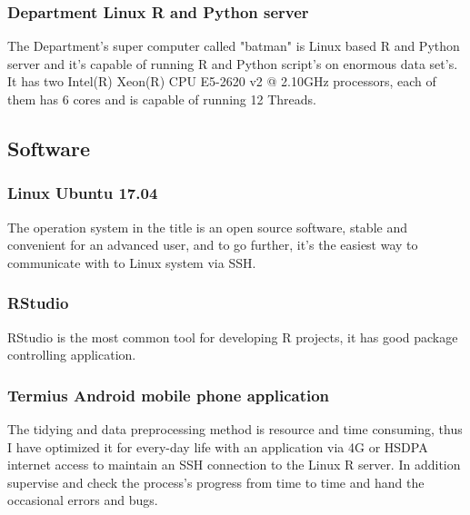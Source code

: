 			\subsubsection{Department Linux R and Python server}
The Department's super computer called "batman" is Linux based R and Python server and it's capable of running R and Python script's on enormous data set's. It has two Intel(R) Xeon(R) CPU E5-2620 v2 @ 2.10GHz processors, each of them has 6 cores and is capable of running 12 Threads.
\cite{Batman}
		\subsection{Software}
			\subsubsection{Linux Ubuntu 17.04}
The operation system in the title is an open source software, stable and convenient for an advanced user, and to go further, it's the easiest way to communicate with to Linux system via SSH.
\cite{Ubuntu}
			\subsubsection{RStudio}
RStudio is the most common tool for developing R projects, it has good package controlling application.
\cite{RStudio}
			\subsubsection{Termius Android mobile phone application}
The tidying and data preprocessing method is resource and time consuming, thus I have optimized it for every-day life with an application via 4G or HSDPA internet access to maintain an SSH connection to the Linux R server. In addition supervise and check the process's progress from time to time and hand the occasional errors and bugs.
\cite{Termius}
